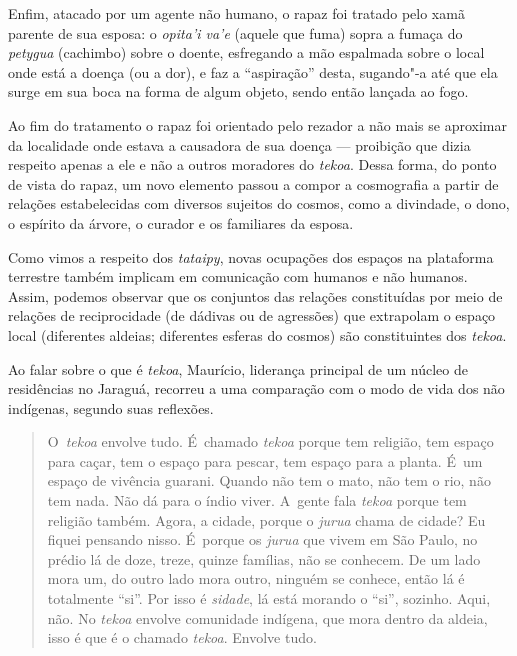 Enfim, atacado por um agente não humano, o rapaz foi tratado pelo xamã
parente de sua esposa: o \emph{opita’i va’e} (aquele que fuma) sopra a fumaça
do \emph{petygua} (cachimbo) sobre o doente, esfregando a mão espalmada
sobre o local onde está a doença (ou a dor), e faz a ``aspiração'' desta,
sugando"-a até que ela surge em sua boca na forma de algum objeto, sendo
então lançada ao fogo. 

Ao fim do tratamento o rapaz foi orientado pelo rezador a não mais se
aproximar da localidade onde estava a causadora de sua doença ---
proibição que dizia respeito apenas a ele e não a outros moradores do
\emph{tekoa}. Dessa forma, do ponto de vista do rapaz, um novo elemento passou
a compor a cosmografia a partir de relações estabelecidas com diversos
sujeitos do cosmos, como a divindade, o dono, o espírito da árvore, o
curador e os familiares da esposa.

Como vimos a respeito dos \emph{tataipy}, novas ocupações dos espaços na
plataforma terrestre também implicam em comunicação com humanos e não
humanos. Assim, podemos observar que os conjuntos das relações
constituídas por meio de relações de reciprocidade (de dádivas ou de
agressões) que extrapolam o espaço local (diferentes aldeias;
diferentes esferas do cosmos) são constituintes dos \emph{tekoa}.

Ao falar sobre o que é \emph{tekoa}, Maurício, liderança principal de um núcleo
de residências no Jaraguá, recorreu a uma comparação com o modo de vida
dos não indígenas, segundo suas reflexões.

\begin{quote}
O~\emph{tekoa} envolve tudo. É~chamado \emph{tekoa} porque tem religião, tem espaço
para caçar, tem o espaço para pescar, tem espaço para a planta. É~um
espaço de vivência guarani. Quando não tem o mato, não tem o rio, não
tem nada. Não dá para o índio viver. A~gente fala \emph{tekoa} porque tem
religião também. Agora, a cidade, porque o \emph{jurua} chama de cidade? Eu
fiquei pensando nisso. É~porque os \emph{jurua} que vivem em São Paulo, no
prédio lá de doze, treze, quinze famílias, não se conhecem. De um lado
mora um, do outro lado mora outro, ninguém se conhece, então lá é
totalmente ``si''. Por isso é \emph{sidade}, lá está morando o ``si'', sozinho.
Aqui, não. No \emph{tekoa} envolve comunidade indígena, que mora dentro da
aldeia, isso é que é o chamado \emph{tekoa}. Envolve tudo.
\end{quote}

